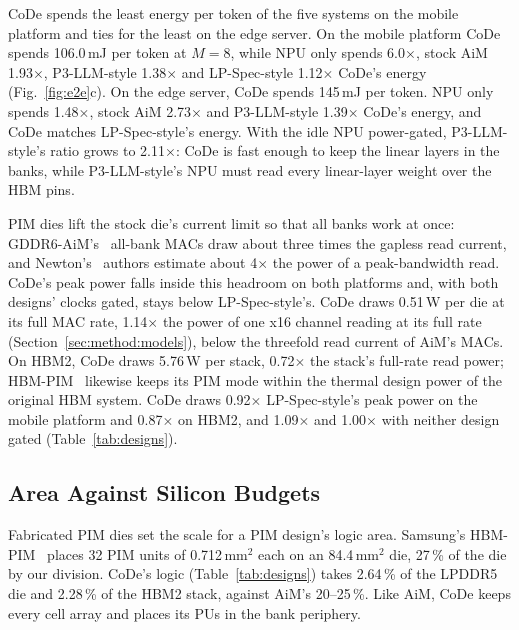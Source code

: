 CoDe spends the least energy per token of the five systems on the mobile platform and ties for the least on the edge
server. On the mobile platform CoDe spends 106.0\,mJ per token at $M = 8$, while NPU only spends 6.0$\times$, stock AiM 1.93$\times$,
P3-LLM-style 1.38$\times$ and LP-Spec-style 1.12$\times$ CoDe's energy (Fig.~\ref{fig:e2e}c). On the edge server, CoDe spends 145\,mJ per token. NPU only spends
1.48$\times$, stock AiM 2.73$\times$ and P3-LLM-style 1.39$\times$ CoDe's energy, and CoDe matches LP-Spec-style's energy. With the idle NPU
power-gated, P3-LLM-style's ratio grows to 2.11$\times$: CoDe is fast enough to keep the linear layers in the banks,
while P3-LLM-style's NPU must read every linear-layer weight over the HBM pins.

PIM dies lift the stock die's \tfaw{} current limit so that all banks work at once: GDDR6-AiM's~\cite{aimjssc} all-bank
MACs draw about three times the gapless read current, and Newton's~\cite{newton} authors estimate about 4$\times$ the
power of a peak-bandwidth read. CoDe's peak power falls inside this headroom on both platforms and, with both designs' clocks gated, stays below
LP-Spec-style's. CoDe draws 0.51\,W per die at its full MAC rate, 1.14$\times$ the power of one x16 channel reading at its full
rate (Section~\ref{sec:method:models}), below the threefold read current of AiM's MACs. On HBM2, CoDe draws
5.76\,W per stack, 0.72$\times$ the stack's full-rate read power; HBM-PIM~\cite{hbmpim} likewise keeps its PIM mode within the thermal design power of the original
HBM system. CoDe draws 0.92$\times$ LP-Spec-style's peak power on the mobile platform and 0.87$\times$ on HBM2, and
1.09$\times$ and 1.00$\times$ with neither design gated (Table~\ref{tab:designs}).

\subsection{Area Against Silicon Budgets}
\label{sec:eval:area}

Fabricated PIM dies set the scale for a PIM design's logic area. Samsung's HBM-PIM~\cite{hbmpim} places 32 PIM units
of 0.712\,mm$^2$ each on an 84.4\,mm$^2$ die, 27\,\% of the die by our division. CoDe's logic (Table~\ref{tab:designs}) takes
2.64\,\% of the LPDDR5 die and 2.28\,\% of the HBM2 stack, against AiM's 20--25\,\%. Like AiM, CoDe keeps every cell array and places its PUs in the bank
periphery.

